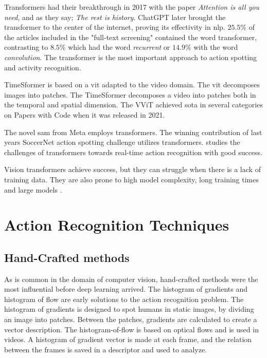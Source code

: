 Transformers had their breakthrough in 2017 with the paper \textit{Attention is all you need}\cite{vaswani_attention_2017}, and as they say; \textit{The rest is history}. ChatGPT later brought the transformer to the center of the internet, proving its effectivity in \acrfull{nlp}. $25.5\%$ of the articles included in the "full-text screening" contained the word transformer, contrasting to $8.5\%$ which had the word \textit{recurrent} or $14.9\%$ with the word \textit{convolution}. The transformer is the most important approach to action spotting and activity recognition. 

TimeSformer \cite{bertasius_timesformer_2021} is based on a \acrfull{vit} adapted to the video domain. The \acrlong{vit} decomposes images into patches. The TimeSformer decomposes a video into patches both in the temporal and spatial dimension. The VViT \cite{arnab_vvit_2021} achieved \acrlong{sota} in several categories on Papers with Code when it was released in 2021. 

The novel \acrlong{sam} from Meta employs transformers. The winning contribution of last years SoccerNet action spotting challenge \cite{denize_comedian_2024} utilizes transformers. \cite{sarraf_optimal_2023} studies the challenges of transformers towards real-time action recognition with good success. 

Vision transformers achieve success, but they can struggle when there is a lack of training data. They are also prone to high model complexity, long training times and large models \cite{lee_enhancing_mamba_s6_2024}.


\section{Action Recognition Techniques} 
\label{sec:action_recognition_techniques}

\subsection{Hand-Crafted methods}

As is common in the domain of computer vision, hand-crafted methods were the most influential before deep learning arrived. The histogram of gradients\cite{dalal_histogram_of_gradients} and histogram of flow \cite{dalal_histogram_of_flow} are early solutions to the action recognition problem. The histogram of gradients is designed to spot humans in static images, by dividing an image into patches. Between the patches, gradients are calculated to create a vector description. The histogram-of-flow is based on optical flows and is used in videos. A histogram of gradient vector is made at each frame, and the relation between the frames is saved in a descriptor and used to analyze. 

